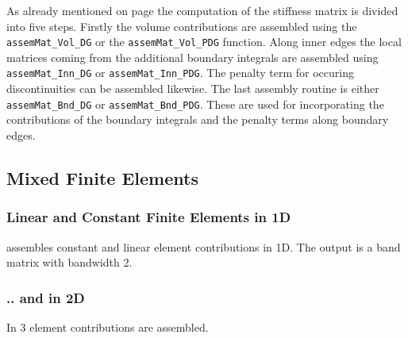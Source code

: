 As already mentioned on page \pageref{ssec:dg} the computation of the stiffness matrix is divided into five steps. Firstly the volume contributions are assembled using the \texttt{assemMat\_Vol\_DG} or the \texttt{assemMat\_Vol\_PDG} function. Along inner edges the local matrices coming from the additional boundary integrals are assembled using \texttt{assemMat\_Inn\_DG} or \texttt{assemMat\_Inn\_PDG}. The penalty term for occuring discontinuities can be assembled likewise. The last assembly routine is either \texttt{assemMat\_Bnd\_DG} or \texttt{assemMat\_Bnd\_PDG}. These are used for incorporating the contributions of the boundary integrals and the penalty terms along boundary edges.


\subsection{Mixed Finite Elements} 

\subsubsection{Linear and Constant Finite Elements in 1D}

  assembles constant and linear element contributions in 1D. The output is a band matrix with bandwidth 2.


\subsubsection{.. and in 2D}

 In  3 element contributions are assembled.


